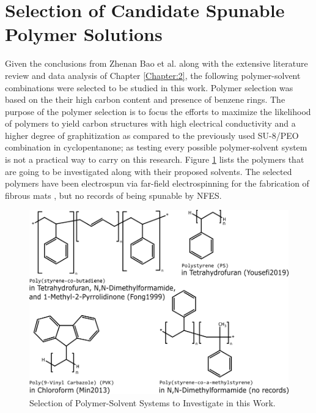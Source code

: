 \section{Selection of Candidate Spunable Polymer Solutions}
Given the conclusions from Zhenan Bao et al. \cite{Liu2015a} along with the extensive literature review and data analysis of Chapter \ref{Chapter:2}, the following polymer-solvent combinations were selected to be studied in this work. Polymer selection was based on the their high carbon content and presence of benzene rings. The purpose of the polymer selection is to focus the efforts to maximize the likelihood of polymers to yield carbon structures with high electrical conductivity and a higher degree of graphitization as compared to the previously used SU-8/PEO combination in cyclopentanone; as testing every possible polymer-solvent system is not a practical way to carry on this research. Figure \ref{fig:selectedpolymers} lists the polymers that are going to be investigated along with their proposed solvents. The selected polymers have been electrospun via far-field electrospinning for the fabrication of fibrous mats \cite{Fong1999, Min2013, Yousefi2019}, but no records of being spunable by NFES. 


\begin{figure}[!th]
\centering
\includegraphics[scale=0.55]{./Figures/selectedpolymers.png}
\decoRule
\caption[Selection of Polymer-Solvent Systems to Investigate in this Work]{Selection of Polymer-Solvent Systems to Investigate in this Work. \cite{Fong1999, Min2013, Yousefi2019}}
\label{fig:selectedpolymers}
\end{figure}

